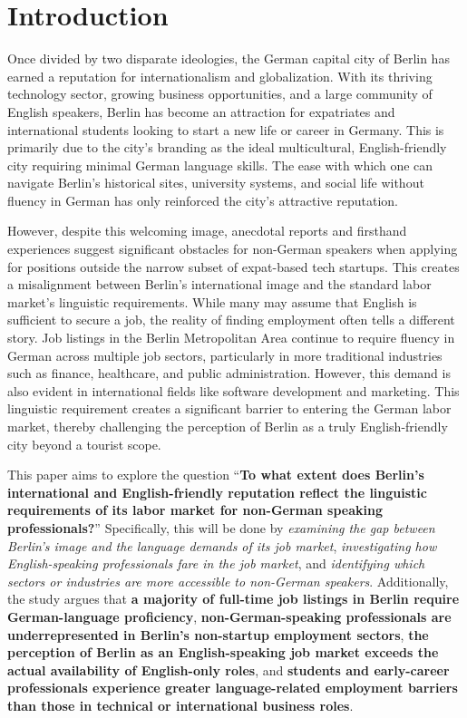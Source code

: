 \titlespacing*{\chapter}{0pt}{0pt}{0pt}

\chapter{Introduction}

Once divided by two disparate ideologies, the German capital city of Berlin has earned a reputation for internationalism and globalization. With its thriving technology sector, growing business opportunities, and a large community of English speakers, Berlin has become an attraction for expatriates and international students looking to start a new life or career in Germany. This is primarily due to the city’s branding as the ideal multicultural, English-friendly city requiring minimal German language skills. The ease with which one can navigate Berlin’s historical sites, university systems, and social life without fluency in German has only reinforced the city’s attractive reputation. 

However, despite this welcoming image, anecdotal reports and firsthand experiences suggest significant obstacles for non-German speakers when applying for positions outside the narrow subset of expat-based tech startups. This creates a misalignment between Berlin’s international image and the standard labor market’s linguistic requirements. While many may assume that English is sufficient to secure a job, the reality of finding employment often tells a different story. Job listings in the Berlin Metropolitan Area continue to require fluency in German across multiple job sectors, particularly in more traditional industries such as finance, healthcare, and public administration. However, this demand is also evident in international fields like software development and marketing. This linguistic requirement creates a significant barrier to entering the German labor market, thereby challenging the perception of Berlin as a truly English-friendly city beyond a tourist scope.

This paper aims to explore the question “\textbf{To what extent does Berlin’s international and English-friendly reputation reflect the linguistic requirements of its labor market for non-German speaking professionals?}” Specifically, this will be done by \emph{examining the gap between Berlin’s image and the language demands of its job market}, \emph{investigating how English-speaking professionals fare in the job market}, and \emph{identifying which sectors or industries are more accessible to non-German speakers}. Additionally, the study argues that \textbf{a majority of full-time job listings in Berlin require German-language proficiency}, \textbf{non-German-speaking professionals are underrepresented in Berlin’s non-startup employment sectors}, \textbf{the perception of Berlin as an English-speaking job market exceeds the actual availability of English-only roles}, and \textbf{students and early-career professionals experience greater language-related employment barriers than those in technical or international business roles}.

